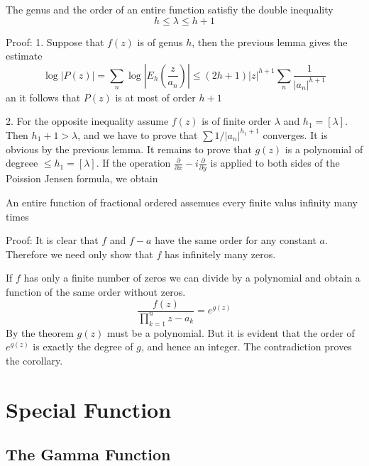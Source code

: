 \documentclass[12pt, oneside]{book}
\begin{document}
\begin{theorem}
    The genus and the order of an entire function satisfiy the double inequality
    $$h\leq \lambda\leq h+1$$

    Proof:
    1. Suppose that $f(z)$ is of genus $h$, then the previous lemma gives the estimate
    $$\log\left|P(z)\right|=\sum_n\log\left|E_h\left(\frac{z}{a_n}\right)\right|\leq(2h+1)\left|z\right|^{h+1}\sum_n\frac{1}{\left|a_n\right|^{h+1}}$$
    an it follows that $P(z)$ is at most of order $h+1$

    2. For the opposite inequality assume $f(z)$ is of finite order $\lambda$ and $h_1=[\lambda]$. Then $h_1+1>\lambda$, and we have to prove that $\sum1/\left|a_n\right|^{h_1+1}$ converges. It is obvious by the previous lemma. It remains to prove that $g(z)$ is a polynomial of degreee $\leq h_1=[\lambda]$. If the operation $\frac{\partial}{\partial x}-i\frac{\partial}{\partial y}$ is applied to both sides of the Poission Jensen formula, we obtain
    $$$$
\end{theorem}
\begin{corollary}
    An entire function of fractional ordered assemues
    every finite valus infinity many times

    Proof: It is clear that $f$ and $f-a$ have the same order for any constant $a$. Therefore we need only show that $f$ has infinitely many zeros.

    If $f$ has only a finite number of zeros we can divide by a polynomial and obtain a function of the same order without zeros.
    $$\frac{f(z)}{\prod\limits_{k=1}^nz-a_k}=e^{g(z)}$$
    By the theorem $g(z)$ must be a polynomial. But it is evident that the order of $e^{g(z)}$ is exactly the degree of $g$, and hence an integer. The contradiction proves the corollary.
\end{corollary}




\chapter{Special Function}

\section{The Gamma Function}
\end{document}
